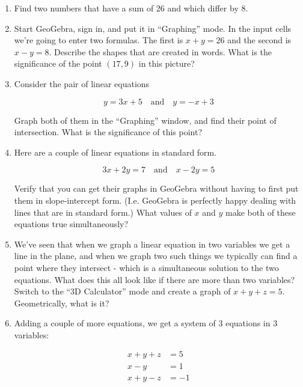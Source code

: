 

\begin{enumerate}

\item Find two numbers that have a sum of 26 and which differ by 8.

\vfill

\item Start GeoGebra, sign in, and put it in ``Graphing'' mode. In the input cells we're going to enter two formulas.  The first is $x+y=26$ and the second is $x-y=8$.
Describe the shapes that are created in words.  What is the significance of the point $(17,9)$ in this picture?

\vfill

\item Consider the pair of linear equations

\[ y = 3x+ 5 \quad \mbox{and} \quad y=-x+3 \]

Graph both of them in the ``Graphing'' window, and find their point of intersection.  What is the significance of this point?

\vfill

\item Here are a couple of linear equations in standard form.

 \[ 3x + 2y = 7 \quad \mbox{and} \quad x - 2y = 5 \]

 Verify that you can get their graphs in GeoGebra without having to first put them in slope-intercept form.  (I.e. GeoGebra is perfectly happy dealing with lines that are in standard form.)  What values of $x$ and $y$ make both of these equations true simultaneously?

 \vfill

\item We've seen that when we graph a linear equation in two variables we get a line in the plane, and when we graph two such things we typically can find a point where they intersect - which is a simultaneous solution to the two equations.  What does this all look like if there are more than two variables?
Switch to the ``3D Calculator'' mode and create a graph of $x+y+z=5$.  Geometrically, what is it?

\vfill

\item Adding a couple of more equations, we get a system of 3 equations in 3 variables:

\begin{align*}
x + y + z &= 5\\
x - y \phantom{ + zz } &= 1\\
x + y - z &= -1
\end{align*}


\end{enumerate}

